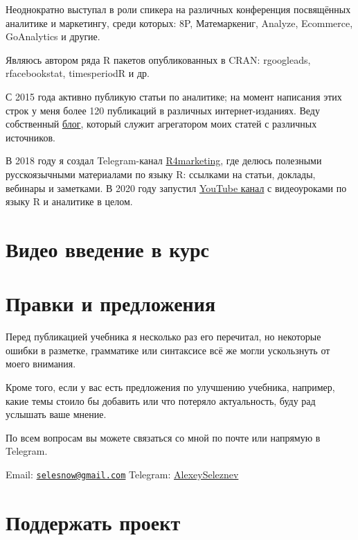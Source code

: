 \documentclass[
]{book}
\begin{document}
Неоднократно выступал в роли спикера на различных конференция посвящённых аналитике и маркетингу, среди которых: 8P, Матемаркениг, Analyze, Ecommerce, GoAnalytics и другие.

Являюсь автором ряда R пакетов опубликованных в CRAN: rgoogleads, rfacebookstat, timesperiodR и др.

С 2015 года активно публикую статьи по аналитике; на момент написания этих строк у меня более 120 публикаций в различных интернет-изданиях. Веду собственный \href{https://alexeyseleznev.wordpress.com/}{блог}, который служит агрегатором моих статей с различных источников.

В 2018 году я создал Telegram-канал \href{https://t.me/R4marketing}{R4marketing}, где делюсь полезными русскоязычными материалами по языку R: ссылками на статьи, доклады, вебинары и заметками. В 2020 году запустил \href{https://bit.ly/36kliAp}{YouTube канал} с видеоуроками по языку R и аналитике в целом.

\section*{Видео введение в курс}\label{ux432ux438ux434ux435ux43e-ux432ux432ux435ux434ux435ux43dux438ux435-ux432-ux43aux443ux440ux441}

\section*{Правки и предложения}\label{ux43fux440ux430ux432ux43aux438-ux438-ux43fux440ux435ux434ux43bux43eux436ux435ux43dux438ux44f}

Перед публикацией учебника я несколько раз его перечитал, но некоторые ошибки в разметке, грамматике или синтаксисе всё же могли ускользнуть от моего внимания.

Кроме того, если у вас есть предложения по улучшению учебника, например, какие темы стоило бы добавить или что потеряло актуальность, буду рад услышать ваше мнение.

По всем вопросам вы можете связаться со мной по почте или напрямую в Telegram.

Email: \href{mailto:selesnow@gmail.com}{\nolinkurl{selesnow@gmail.com}}
Telegram: \href{http://t.me/AlexeySeleznev}{AlexeySeleznev}

\section*{Поддержать проект}\label{ux43fux43eux434ux434ux435ux440ux436ux430ux442ux44c-ux43fux440ux43eux435ux43aux442}
\end{document}

